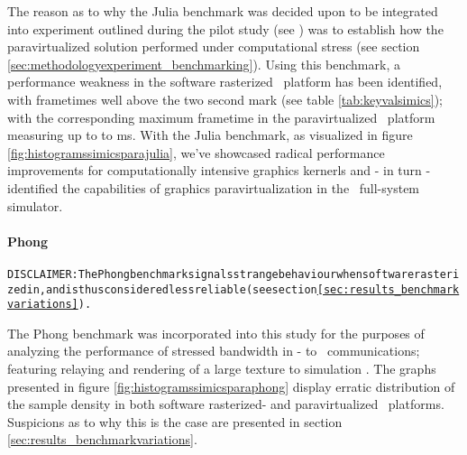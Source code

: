The reason as to why the Julia benchmark was decided upon to be integrated into experiment outlined during the pilot study (see ) was to establish how the paravirtualized solution performed under computational stress (see section \ref{sec:methodologyexperiment_benchmarking}).
Using this benchmark, a performance weakness in the software rasterized \dvttermsimics\ platform has been identified, with frametimes well above the two second mark (see table \ref{tab:keyvalsimics}); with the corresponding maximum frametime in the paravirtualized \dvttermsimics\ platform measuring up to to  ms.
With the Julia benchmark, as visualized in figure \ref{fig:histogramssimicsparajulia}, we've showcased radical performance improvements for computationally intensive graphics kernerls and - in turn - identified the capabilities of graphics paravirtualization in the \dvttermsimics\ full-system simulator.




\paragraph{Phong}
\label{par:results_phong}
\begin{alltt}
DISCLAIMER: The Phong benchmark signals strange behaviour when software rasterized in \dvttermsimics , and is thus considered less reliable (see section \ref{sec:results_benchmarkvariations}).
\end{alltt}

\noindent
The Phong benchmark was incorporated into this study for the purposes of analyzing the performance of stressed bandwidth in \dvttermtarget - to \dvttermhost\ communications; featuring relaying and rendering of a large texture to simulation \dvttermhost .
The graphs presented in figure \ref{fig:histogramssimicsparaphong} display erratic distribution of the sample density in both software rasterized- and paravirtualized \dvttermsimics\ platforms.
Suspicions as to why this is the case are presented in section \ref{sec:results_benchmarkvariations}.

